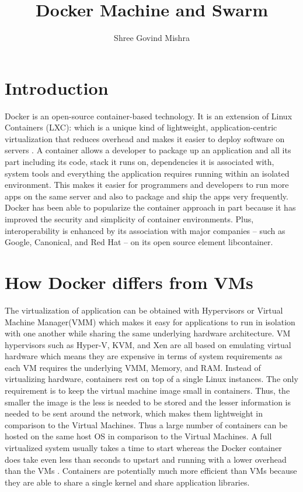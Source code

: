 \documentclass[9pt,twocolumn,twoside]{../../styles/osajnl}
\title{Docker Machine and Swarm}
\author[1]{Shree Govind Mishra}
\affil[1]{School of Informatics and Computing, Bloomington, IN 47408, U.S.A.}
\affil[*]{Corresponding authors:shremish@indiana.edu}
\begin{document}
\maketitle


\section{Introduction}
Docker is an open-source container-based technology. It is an
extension of Linux Containers (LXC): which is a unique kind of
lightweight, application-centric virtualization that reduces overhead
and makes it easier to deploy software on
servers \cite{www-docker-2}. A container allows a developer to package
up an application and all its part including its code, stack it runs
on, dependencies it is associated with, system tools and everything
the application requires running  within an isolated environment. This
makes it easier for programmers and developers to run more apps on the
same server and also to package and ship the apps very frequently.
Docker has been able to popularize the container approach in part
because it has improved the security and simplicity of container
environments. Plus, interoperability is enhanced by its association
with major companies – such as Google, Canonical, and Red Hat – on its
open source element libcontainer.

\section{How Docker differs from VMs}

The virtualization of application can be obtained with Hypervisors or
Virtual Machine Manager(VMM) which makes it easy for applications to
run in isolation with one another while sharing the same
underlying hardware architecture. VM hypervisors such as Hyper-V, KVM,
and Xen are all based on emulating virtual hardware which means they
are expensive in terms of system requirements as each VM requires the
underlying VMM, Memory, and RAM. Instead of virtualizing hardware,
containers rest on top of a single Linux instances. The only
requirement is to keep the virtual machine image small in containers.
Thus, the smaller the image is the less is needed to be stored and the
lesser information is needed to be sent around the network, which
makes them lightweight in comparison to the Virtual Machines. Thus a
large number of containers can be hosted on the same host OS in
comparison to the Virtual Machines. A full virtualized system usually
takes a time to start whereas the Docker container does take even less
than seconds to upstart and running with a lower overhead than the
VMs \cite{www-stackoverflow-docker}.  Containers are potentially much
more efficient than VMs because they are able to share a single kernel
and share application libraries.
\end{document}
